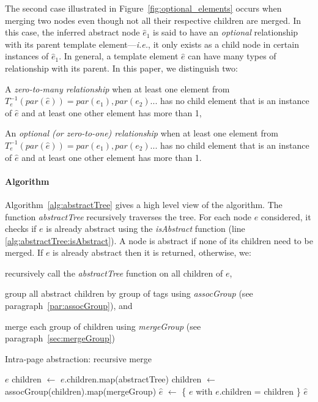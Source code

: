 \documentclass[sigconf,authordraft]{acmart}
\theoremstyle{definition}
\begin{document}
The second case illustrated in Figure~\ref{fig:optional_elements} occurs when merging two nodes even though not all their respective children are merged.
In this case, the inferred abstract node $\hat{e}_1$ is said to have an \textit{optional} relationship with its parent template element---\emph{i.e.}, it only exists as a child node in certain instances of $\hat{e}_1$.
In general, a template element $\hat{e}$ can have many types of relationship with its parent.
In this paper, we distinguish two:
\begin{compactitem}
    \item A \emph{zero-to-many relationship} when at least one element from $T^{-1}_e(par(\hat{e})) = par(e_1), par(e_2)...$ has no child element that is an instance of $\hat{e}$ and at least one other element has more than 1,
    \item An \emph{optional (or zero-to-one) relationship} when at least one element from $T^{-1}_e(par(\hat{e})) = par(e_1), par(e_2)...$ has no child element that is an instance of $\hat{e}$ and at least one other element has more than 1.
\end{compactitem}

\paragraph{Algorithm}
Algorithm~\ref{alg:abstractTree} gives a high level view of the algorithm.
The function \emph{abstractTree} recursively traverses the tree.
For each node $e$ considered, it checks if $e$ is already abstract using the \emph{isAbstract} function (line \ref{alg:abstractTree:isAbstract}).
A node is abstract if none of its children need to be merged.
If $e$ is already abstract then it is returned, otherwise, we:
\begin{compactenum}
  \item recursively call the \emph{abstractTree} function on all children of $e$,
  \item group all abstract children by group of tags using \emph{assocGroup} (see paragraph~\ref{par:assocGroup}), and
  \item merge each group of children using \emph{mergeGroup} (see paragraph~\ref{sec:mergeGroup})
\end{compactenum}

\begin{algorithm}
\caption{Intra-page abstraction: recursive merge}\label{alg:abstractTree}
\begin{algorithmic}[1]
      \label{alg:abstractTree:isAbstract}
      \State \Return $e$
    \Else
      \State children $\gets$ $e$.children.map(abstractTree)
      \State children $\gets$ assocGroup(children).map(mergeGroup)
      \State $\hat{e}$ $\gets$ \{ $e$ with $e$.children = children \}
      \State \Return $\hat{e}$
    \EndIf
  \EndFunction
\end{algorithmic}
\end{algorithm}
\end{document}
